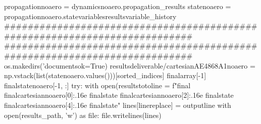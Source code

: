 {}
\markdownRendererSectionEnd \markdownRendererSectionBegin
{}\markdownRendererInterblockSeparator
{}propagationnoaero = dynamicsnoaero.propagation_results\markdownRendererInterblockSeparator
{}
\markdownRendererSectionEnd \markdownRendererSectionBegin
{}\markdownRendererInterblockSeparator
{}statenoaero = propagationnoaero.statevariablesresultsvariable_history\markdownRendererInterblockSeparator
{}###########################################################################\markdownRendererInterblockSeparator
{}
\markdownRendererSectionEnd \markdownRendererSectionBegin
{}\markdownRendererInterblockSeparator
{}########################################################################### os.makedirs('documentsok=True) resultsdeliverable/cartesianAE4868A1noaero = np.vstack(list(statenoaero.values()))[sorted_indices] finalarray[-1] finalstatenoaero[-1, :] try: with open(resultstotoline = f"{final {final}cartesiannoaero[0]:.16e} {finalstate {final}cartesiannoaero[2]:.16e} {finalstate {final}cartesiannoaero[4]:.16e} {finalstate\n" lines[linereplace] = output}line with open(results_path, 'w') as file: file.writelines(lines)\markdownRendererInterblockSeparator
